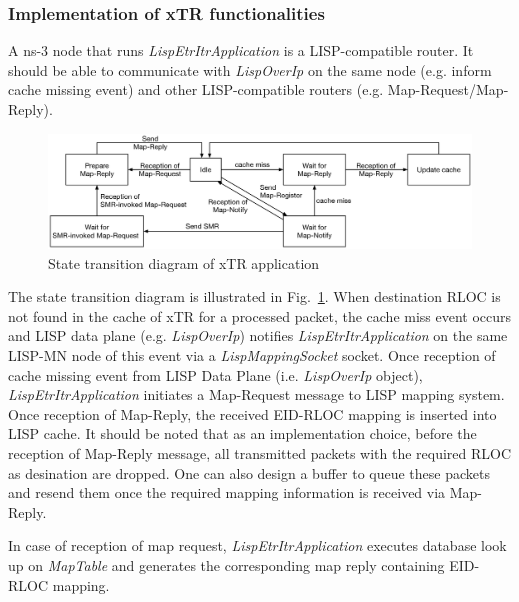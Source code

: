 \subsubsection{Implementation of xTR functionalities}
 A ns-3 node that runs \emph{LispEtrItrApplication} is a LISP-compatible router. It should be able to communicate with \emph{LispOverIp} on the same node (e.g. inform cache missing event) and other LISP-compatible routers (e.g. Map-Request/Map-Reply). 
\begin{figure}[!t]
	\centering
	\includegraphics[width=\textwidth]{Pics/xTR_state_transition.eps}
	\caption{State transition diagram of xTR application}
	\label{fig:xTR-state-transition}
\end{figure}
The state transition diagram is illustrated in Fig.~\ref{fig:xTR-state-transition}. When destination RLOC is not found in the cache of xTR for a processed packet, the cache miss event occurs and LISP data plane (e.g. \emph{LispOverIp}) notifies \emph{LispEtrItrApplication} on the same LISP-MN node of this event via a \emph{LispMappingSocket} socket. Once reception of cache missing event from LISP Data Plane (i.e. \emph{LispOverIp} object), \emph{LispEtrItrApplication} initiates a Map-Request message to LISP mapping system. Once reception of Map-Reply, the received EID-RLOC mapping is inserted into LISP cache. 
It should be noted that as an implementation choice, before the reception of Map-Reply message, all transmitted packets with the required RLOC as desination are dropped. One can also design a buffer to queue these packets and resend them once the required mapping information is received via Map-Reply.

In case of reception of map request, \emph{LispEtrItrApplication} executes database look up on \emph{MapTable} and generates the corresponding map reply containing EID-RLOC mapping.

